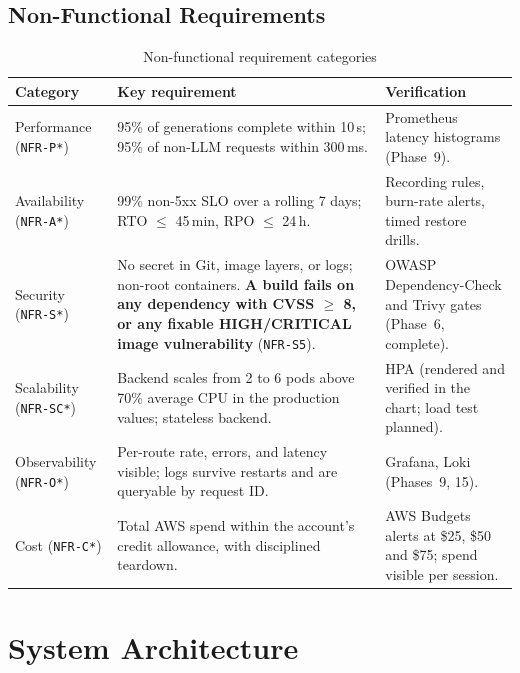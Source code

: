 \documentclass[11pt,a4paper]{article}
\newcommand{\reqid}[1]{\texttt{#1}}
\begin{document}
\subsection{Non-Functional Requirements}
\begin{table}[H]
\centering
\begin{tabularx}{\textwidth}{@{}L{2.9cm} Y L{4.2cm}@{}}
\toprule
\textbf{Category} & \textbf{Key requirement} & \textbf{Verification} \\
\midrule
Performance \newline (\reqid{NFR-P*}) &
    95\% of generations complete within 10\,s; 95\% of non-LLM requests
    within 300\,ms. &
    Prometheus latency histograms (Phase~9). \\
Availability \newline (\reqid{NFR-A*}) &
    99\% non-5xx SLO over a rolling 7 days; RTO $\leq$ 45\,min,
    RPO $\leq$ 24\,h. &
    Recording rules, burn-rate alerts, timed restore drills. \\
Security \newline (\reqid{NFR-S*}) &
    No secret in Git, image layers, or logs; non-root containers.
    \textbf{A build fails on any dependency with CVSS $\geq$ 8, or any
    fixable HIGH/CRITICAL image vulnerability} (\reqid{NFR-S5}). &
    OWASP Dependency-Check and Trivy gates (Phase~6, complete). \\
Scalability \newline (\reqid{NFR-SC*}) &
    Backend scales from 2 to 6 pods above 70\% average CPU in the production
    values; stateless backend. &
    HPA (rendered and verified in the chart; load test planned). \\
Observability \newline (\reqid{NFR-O*}) &
    Per-route rate, errors, and latency visible; logs survive restarts and
    are queryable by request ID. &
    Grafana, Loki (Phases~9, 15). \\
Cost \newline (\reqid{NFR-C*}) &
    Total AWS spend within the account's credit allowance, with disciplined
    teardown. &
    AWS Budgets alerts at \$25, \$50 and \$75; spend visible per session. \\
\bottomrule
\end{tabularx}
\caption{Non-functional requirement categories}
\label{tab:nfr-summary}
\end{table}

\section{System Architecture}
\label{sec:architecture}
\end{document}
